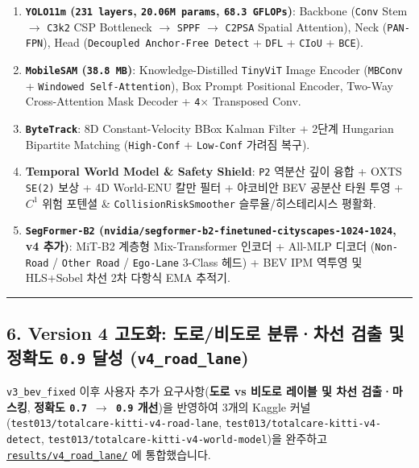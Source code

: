 \documentclass[10.5pt,a4paper]{article}
\begin{document}
\begin{enumerate}[leftmargin=1.8em,itemsep=2pt]
\item \textbf{\texttt{YOLO11m} (\texttt{231 layers}, \texttt{20.\allowbreak{}06M params}, \texttt{68.\allowbreak{}3 GFLOPs})}: Backbone (\texttt{Conv} Stem $\rightarrow$ \texttt{C3k2} CSP Bottleneck $\rightarrow$ \texttt{SPPF} $\rightarrow$ \texttt{C2PSA} Spatial Attention), Neck (\texttt{PAN-\allowbreak{}FPN}), Head (\texttt{Decoupled Anchor-\allowbreak{}Free Detect} + \texttt{DFL} + \texttt{CIoU} + \texttt{BCE}).
\item \textbf{\texttt{MobileSAM} (\texttt{38.\allowbreak{}8 MB})}: Knowledge-Distilled \texttt{TinyViT} Image Encoder (\texttt{MBConv} + \texttt{Windowed Self-\allowbreak{}Attention}), Box Prompt Positional Encoder, Two-Way Cross-Attention Mask Decoder + \texttt{4$\times$} Transposed Conv.
\item \textbf{\texttt{ByteTrack}}: 8D Constant-Velocity BBox Kalman Filter + 2단계 Hungarian Bipartite Matching (\texttt{High-\allowbreak{}Conf} + \texttt{Low-\allowbreak{}Conf} 가려짐 복구).
\item \textbf{Temporal World Model \& Safety Shield}: \texttt{P2} 역분산 깊이 융합 + OXTS \texttt{SE(2)} 보상 + 4D World-ENU 칼만 필터 + 야코비안 BEV 공분산 타원 투영 + $C^1$ 위험 포텐셜 \& \texttt{CollisionRiskSmoother} 슬루율/히스테리시스 평활화.
\item \textbf{\texttt{SegFormer-\allowbreak{}B2} (\texttt{nvidia/\allowbreak{}segformer-\allowbreak{}b2-\allowbreak{}finetuned-\allowbreak{}cityscapes-\allowbreak{}1024-\allowbreak{}1024}, v4 추가)}: MiT-B2 계층형 Mix-Transformer 인코더 + All-MLP 디코더 (\texttt{Non-\allowbreak{}Road} / \texttt{Other Road} / \texttt{Ego-\allowbreak{}Lane} 3-Class 헤드) + BEV IPM 역투영 및 HLS+Sobel 차선 2차 다항식 EMA 추적기.
\end{enumerate}

\par\noindent\rule{\textwidth}{0.4pt}\par\medskip

\subsection{6. Version 4 고도화: 도로/비도로 분류·차선 검출 및 정확도 \texttt{0.\allowbreak{}9} 달성 (\texttt{v4\_\allowbreak{}road\_\allowbreak{}lane})}

\texttt{v3\_\allowbreak{}bev\_\allowbreak{}fixed} 이후 사용자 추가 요구사항(\textbf{도로 vs 비도로 레이블 및 차선 검출·마스킹}, \textbf{정확도 \texttt{0.\allowbreak{}7 $\rightarrow$ 0.\allowbreak{}9} 개선})을 반영하여 3개의 Kaggle 커널(\texttt{test013/\allowbreak{}totalcare-\allowbreak{}kitti-\allowbreak{}v4-\allowbreak{}road-\allowbreak{}lane}, \texttt{test013/\allowbreak{}totalcare-\allowbreak{}kitti-\allowbreak{}v4-\allowbreak{}detect}, \texttt{test013/\allowbreak{}totalcare-\allowbreak{}kitti-\allowbreak{}v4-\allowbreak{}world-\allowbreak{}model})을 완주하고 \href{https://github.com/Heisnotanimposter/Totalcare\_autonomous\_driving\_Yolov5/tree/main/results/v4\_road\_lane/}{\texttt{results/\allowbreak{}v4\_\allowbreak{}road\_\allowbreak{}lane/\allowbreak{}}} 에 통합했습니다.
\end{document}
